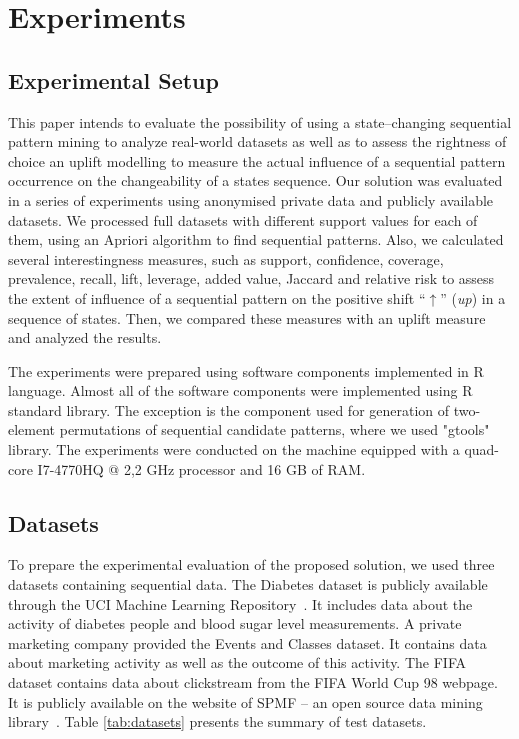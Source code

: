 \documentclass[runningheads,a4paper]{llncs}
\begin{document}
\section{Experiments}
\label{sec:experiments}
\subsection{Experimental Setup}
This paper intends to evaluate the possibility of using a state--changing sequential pattern mining to analyze real-world datasets as well as to assess the rightness of choice an uplift modelling to measure the actual influence of a sequential pattern occurrence on the changeability of a states sequence. Our solution was evaluated in a series of experiments using anonymised private data and publicly available datasets. We processed full datasets with different support values for each of them, using an Apriori algorithm to find sequential patterns. Also, we calculated several interestingness measures, such as support, confidence, coverage, prevalence, recall, lift, leverage, added value, Jaccard and relative risk to assess the extent of influence of a sequential pattern on the positive shift ``$\uparrow$'' (\textit{up}) in a sequence of states. Then, we compared these measures with an uplift measure and analyzed the results. 

The experiments were prepared using software components implemented in R language. Almost all of the software components were implemented using R standard library. The exception is the component used for generation of two-element permutations of sequential candidate patterns, where we used "gtools" library. The experiments were conducted on the machine equipped with a quad-core I7-4770HQ @ 2,2 GHz processor and 16 GB of RAM.

\subsection{Datasets}
To prepare the experimental evaluation of the proposed solution, we used three datasets containing sequential data. The Diabetes dataset is publicly available through the UCI Machine Learning Repository~\cite{Kahn:1994}. It includes data about the activity of diabetes people and blood sugar level measurements. A private marketing company provided the Events and Classes dataset. It contains data about marketing activity as well as the outcome of this activity. The FIFA dataset contains data about clickstream from the FIFA World Cup 98 webpage. It is publicly available on the website of SPMF – an open source data mining library~\cite{Fournier}. Table \ref{tab:datasets} presents the summary of test datasets.
\end{document}
